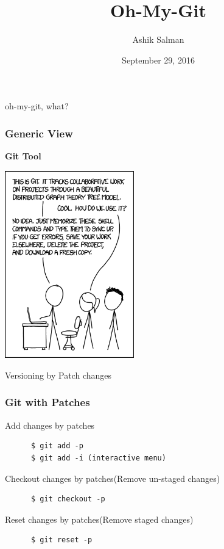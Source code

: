 \documentclass[10pt]{beamer}
\title{Oh-My-Git}
\author{Ashik Salman}
\institute[UMBC]{Awesome Git tweaks \\
  ..... \\
  Backend Developer \\
  Chillr, Backwater Technologies \\
  Kochi, Kerala \\

}
\date{September 29, 2016}
\begin{document}

\begin{frame}[plain]
  \titlepage
\end{frame}
	
\begin{frame}
  \begin{center}
    \Huge{oh-my-git, what?}
  \end{center}
\end{frame}

\begin{frame}
	\frametitle{Generic View}
	\textbf{Git Tool}
	\begin{center}
	\includegraphics[width=0.42\textwidth]{git-xkcd.png}
	\end{center}
\end{frame}

\begin{frame}
  \begin{center}
    \Huge{Versioning by Patch changes}
  \end{center}
\end{frame}

\begin{frame}[fragile]
  \frametitle{Git with Patches}
  \begin{block}{Add changes by patches}
    \begin{verbatim}
      $ git add -p
      $ git add -i (interactive menu)
    \end{verbatim}
  \end{block}
  \pause
  \begin{block}{Checkout changes by patches(Remove un-staged changes)}
    \begin{verbatim}
      $ git checkout -p
    \end{verbatim}
  \end{block}
  \pause
  \begin{block}{Reset changes by patches(Remove staged changes)}
    \begin{verbatim}
      $ git reset -p
    \end{verbatim}
  \end{block}
\end{frame}
\end{document}
